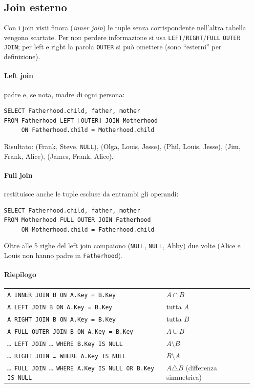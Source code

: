 \documentclass[a4paper,12pt]{article}
\begin{document}
\subsection{Join esterno}

Con i join visti finora (\emph{inner join}) le tuple senza corrispondente
nell'altra tabella vengono scartate. Per non perdere informazione si usa
\texttt{LEFT}/\texttt{RIGHT}/\texttt{FULL} \texttt{OUTER JOIN}; per left e right
la parola \texttt{OUTER} si può omettere (sono ``esterni'' per definizione).

\paragraph{Left join} padre e, se nota, madre di ogni persona:
\begin{verbatim}
SELECT Fatherhood.child, father, mother
FROM Fatherhood LEFT [OUTER] JOIN Motherhood
     ON Fatherhood.child = Motherhood.child
\end{verbatim}
Risultato: (Frank, Steve, \texttt{NULL}), (Olga, Louis, Jesse), (Phil, Louis,
Jesse), (Jim, Frank, Alice), (James, Frank, Alice).

\paragraph{Full join} restituisce anche le tuple escluse da entrambi gli
operandi:
\begin{verbatim}
SELECT Fatherhood.child, father, mother
FROM Motherhood FULL OUTER JOIN Fatherhood
     ON Motherhood.child = Fatherhood.child
\end{verbatim}
Oltre alle 5 righe del left join compaiono (\texttt{NULL}, \texttt{NULL},
Abby) due volte (Alice e Louis non hanno padre in \texttt{Fatherhood}).

\paragraph{Riepilogo}
\begin{center}
\begin{tabular}{ll}
\texttt{A INNER JOIN B ON A.Key = B.Key} & $A \cap B$\\
\texttt{A LEFT JOIN B ON A.Key = B.Key} & tutta $A$\\
\texttt{A RIGHT JOIN B ON A.Key = B.Key} & tutta $B$\\
\texttt{A FULL OUTER JOIN B ON A.Key = B.Key} & $A \cup B$\\
\texttt{\dots\ LEFT JOIN \dots\ WHERE B.Key IS NULL} & $A \setminus B$\\
\texttt{\dots\ RIGHT JOIN \dots\ WHERE A.Key IS NULL} & $B \setminus A$\\
\texttt{\dots\ FULL JOIN \dots\ WHERE A.Key IS NULL OR B.Key IS NULL} &
  $A \triangle B$ (differenza simmetrica)\\
\end{tabular}
\end{center}
\end{document}
